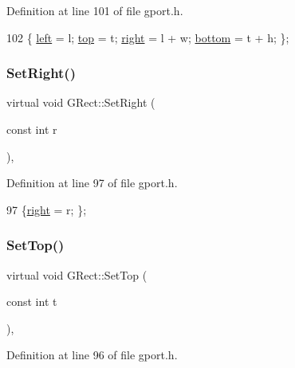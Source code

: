 Definition at line 101 of file gport.\+h.


\begin{DoxyCode}
102         \{ \mbox{\hyperlink{class_g_rect_ab848c49d0c6376f749a592042791b98b}{left}} = l; \mbox{\hyperlink{class_g_rect_af22c8a22a7d2fe0f139375e7eb171675}{top}} = t; \mbox{\hyperlink{class_g_rect_a361868c6c368e642abcaf3e4823b1e70}{right}} = l + w; \mbox{\hyperlink{class_g_rect_a767f1eb55f7e9880f58609406b2d6a66}{bottom}} = t + h; \};
\end{DoxyCode}
\mbox{\label{class_g_rect_a2293c5054272c0aba84624edf82b5b3b}} 
\subsubsection{\texorpdfstring{Set\+Right()}{SetRight()}}
{\footnotesize\ttfamily virtual void G\+Rect\+::\+Set\+Right (\begin{DoxyParamCaption}\item[{const int}]{r }\end{DoxyParamCaption})\hspace{0.3cm}{\ttfamily [inline]}, {\ttfamily [virtual]}}



Definition at line 97 of file gport.\+h.


\begin{DoxyCode}
97 \{\mbox{\hyperlink{class_g_rect_a361868c6c368e642abcaf3e4823b1e70}{right}} = r; \};
\end{DoxyCode}
\mbox{\label{class_g_rect_a87864ea06d8f6796b296fd73ac3d1a95}} 
\subsubsection{\texorpdfstring{Set\+Top()}{SetTop()}}
{\footnotesize\ttfamily virtual void G\+Rect\+::\+Set\+Top (\begin{DoxyParamCaption}\item[{const int}]{t }\end{DoxyParamCaption})\hspace{0.3cm}{\ttfamily [inline]}, {\ttfamily [virtual]}}



Definition at line 96 of file gport.\+h.


